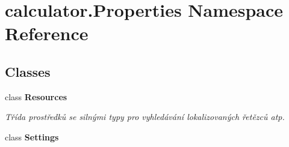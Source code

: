 \section{calculator.\+Properties Namespace Reference}
\label{namespacecalculator_1_1_properties}
\subsection*{Classes}
\begin{DoxyCompactItemize}
\item 
class {\bfseries Resources}
\begin{DoxyCompactList}\small\item\em Třída prostředků se silnými typy pro vyhledávání lokalizovaných řetězců atp. \end{DoxyCompactList}\item 
class {\bfseries Settings}
\end{DoxyCompactItemize}
